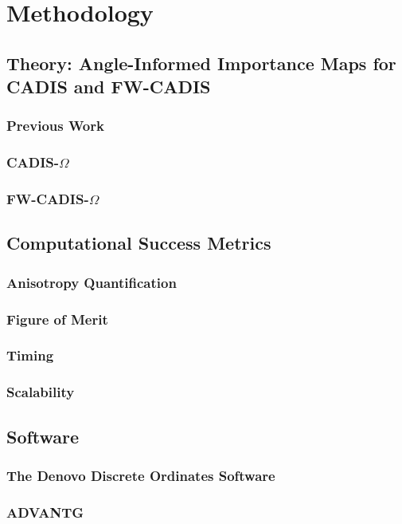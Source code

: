 \chapter{Methodology}

\section{Theory: Angle-Informed Importance Maps for CADIS and FW-CADIS}
\subsection{Previous Work}
\subsection{CADIS-$\Omega$}
\subsection{FW-CADIS-$\Omega$}
\section{Computational Success Metrics}
\subsection{Anisotropy Quantification}
\subsection{Figure of Merit}
\subsection{Timing}
\subsection{Scalability}
\section{Software}
\subsection{The Denovo Discrete Ordinates Software}
\subsection{ADVANTG}

